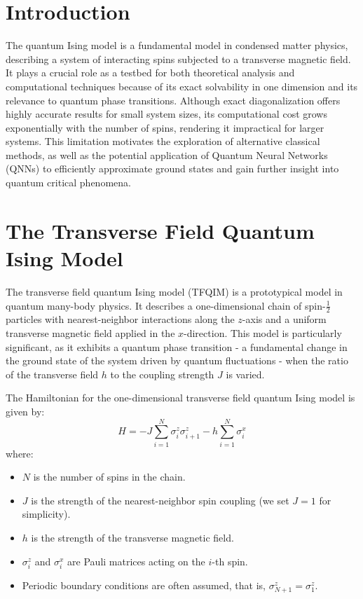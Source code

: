 \documentclass[a4paper]{article}
\begin{document}
\section{Introduction} \label{1}%
The quantum Ising model is a fundamental model in condensed matter physics, describing a system of interacting spins subjected to a transverse magnetic field. It plays a crucial role as a testbed for both theoretical analysis and computational techniques because of its exact solvability in one dimension and its relevance to quantum phase transitions. Although exact diagonalization offers highly accurate results for small system sizes, its computational cost grows exponentially with the number of spins, rendering it impractical for larger systems. This limitation motivates the exploration of alternative classical methods, as well as the potential application of Quantum Neural Networks (QNNs) to efficiently approximate ground states and gain further insight into quantum critical phenomena.



\section{The Transverse Field Quantum Ising Model}

The transverse field quantum Ising model (TFQIM) is a prototypical model in quantum many-body physics. It describes a one-dimensional chain of spin-$\frac{1}{2}$ particles with nearest-neighbor interactions along the $z$-axis and a uniform transverse magnetic field applied in the $x$-direction. This model is particularly significant, as it exhibits a quantum phase transition - a fundamental change in the ground state of the system driven by quantum fluctuations - when the ratio of the transverse field $h$ to the coupling strength $J$ is varied.

The Hamiltonian for the one-dimensional transverse field quantum Ising model is given by:
\begin{equation}
    H = -J \sum_{i=1}^{N} \sigma_i^{z} \sigma_{i+1}^{z} - h \sum_{i=1}^{N} \sigma_i^{x}
\end{equation}
where:
\begin{itemize}
    \item $N$ is the number of spins in the chain.
    \item $J$ is the strength of the nearest-neighbor spin coupling (we set $J = 1$ for simplicity).
    \item $h$ is the strength of the transverse magnetic field.
    \item $\sigma_i^z$ and $\sigma_i^x$ are Pauli matrices acting on the $i$-th spin.
    \item Periodic boundary conditions are often assumed, that is, $\sigma^z_{N+1} = \sigma^z_1$.
\end{itemize}
\end{document}
